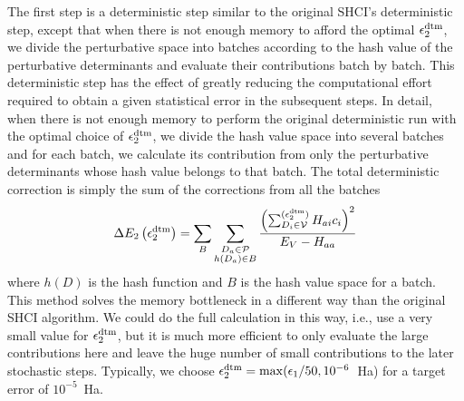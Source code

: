 \documentclass[%
reprint,
 superscriptaddress,
 amsmath,amssymb,
 aps,
]{revtex4-1}
\def\beq{\begin{eqnarray}}
\def\eeq{\end{eqnarray}}
\def\V{\mathcal{V}}
\def\P{\mathcal{P}}
\begin{document}
The first step is a deterministic step similar to the original SHCI's deterministic step,
except that when there is not enough memory to afford the optimal $\epsilon_2^{\rm dtm}$, we divide the perturbative space into batches according to the hash value of the perturbative determinants and evaluate their contributions batch by batch.
This deterministic step has the effect of greatly reducing the computational effort required to obtain a given statistical
error in the subsequent steps.
In detail, when there is not enough memory to perform the original deterministic run with the optimal choice of $\epsilon_2^{\rm dtm}$, we divide the hash value space into several batches and for each batch, we calculate its contribution from only the perturbative determinants whose hash value belongs to that batch.
The total deterministic correction is simply the sum of the corrections from all the batches
\beq
\Delta E_{2} \left(\epsilon_2^{\rm dtm} \right) = \sum_{B} \sum_{\substack{D_{a} \in \P \\ h(D_a)\in B}} \frac{\left(\sum^{(\epsilon_2^{\rm dtm})}_{D_{i} \in \V} H_{a i} c_{i}\right) ^{2}}{E_{V} - H_{a a}}
\eeq
where $h(D)$ is the hash function and $B$ is the hash value space for a batch.
This method solves the memory bottleneck in a different way than the original SHCI algorithm.
We could do the full calculation in this way, i.e., use a very small value for $\epsilon_2^{\rm dtm}$,
but it is much more efficient to only evaluate the large contributions here and leave the huge number of small contributions to the later stochastic steps.
Typically, we choose $\epsilon_2^{\rm dtm} = \max(\epsilon_{1}/50, 10^{-6}$~Ha) for a target error of $10^{-5}$~Ha.
\end{document}

